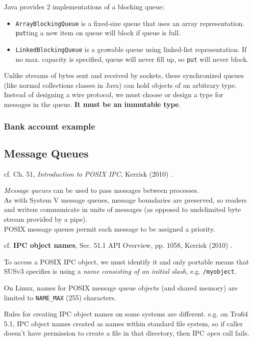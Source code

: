 \documentclass[10pt]{amsart}
\begin{document}
\begin{multicols*}{2}
Java provides 2 implementations of a blocking queue:
\begin{itemize}
	\item \verb|ArrayBlockingQueue| is a fixed-size queue that uses an array representation. \verb|put|ting a new item on queue will block if queue is full.
	\item \verb|LinkedBlockingQueue| is a growable queue using linked-list representation. If no max. capacity is specified, queue will never fill up, so \verb|put| will never block.
\end{itemize}

Unlike streams of bytes sent and received by sockets, these synchronized queues (like normal collections classes in Java) can hold objects of an arbitrary type. Instead of designing a wire protocol, we must choose or design a type for messages in the queue. \textbf{It must be an immutable type}. 


\subsubsection{Bank account example}



\subsection{Message Queues}

cf. Ch. 51, \emph{Introduction to POSIX IPC}, Kerrisk (2010) \cite{Kerr2010}.

\emph{Message queues} can be used to pass messages between processes. \\
As with System V message queues, message boundaries are preserved, so readers and writers communicate in units of messages (as opposed to undelimited byte stream provided by a pipe). \\
POSIX message queues permit each message to be assigned a priority.

cf. \textbf{IPC object names}, Sec. 51.1 API Overview, pp. 1058, Kerrisk (2010) \cite{Kerr2010}.

To access a POSIX IPC object, we must identify it and only portable means that SUSv3 specifies is using a \emph{name consisting of an initial slash}, e.g. \verb|/myobject|.

On Linux, names for POSIX message queue objects (and shared memory) are limited to \verb|NAME_MAX| (255) characters.

Rules for creating IPC object names on some systems are different. e.g. on Tru64 5.1, IPC object names created as names within standard file system, so if caller doesn't have permission to create a file in that directory, then IPC \emph{open} call fails.


\end{multicols*}
\end{document}
